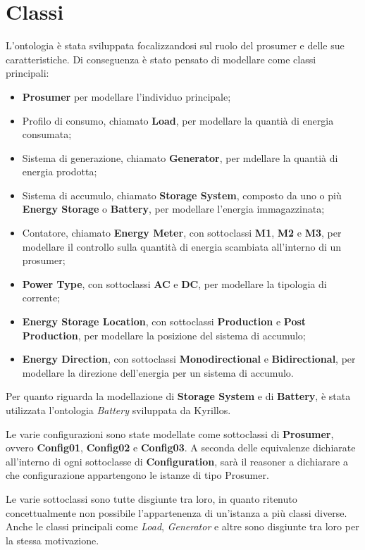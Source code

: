 \section{Classi}
L'ontologia è stata sviluppata focalizzandosi sul ruolo del prosumer e delle sue caratteristiche.
Di conseguenza è stato pensato di modellare come classi principali:
\begin{itemize}
    \item \textbf{Prosumer} per modellare l'individuo principale;
    \item Profilo di consumo, chiamato \textbf{Load}, per modellare la quantià di energia consumata;
    \item Sistema di generazione, chiamato \textbf{Generator}, per mdellare la quantià di energia prodotta;
    \item Sistema di accumulo, chiamato \textbf{Storage System}, composto da uno o più \textbf{Energy Storage} o \textbf{Battery}, per modellare l'energia immagazzinata;
    \item Contatore, chiamato \textbf{Energy Meter}, con sottoclassi \textbf{M1}, \textbf{M2} e \textbf{M3}, per modellare il controllo sulla quantità di energia scambiata all'interno di un prosumer;
    \item \textbf{Power Type}, con sottoclassi \textbf{AC} e \textbf{DC}, per modellare la tipologia di corrente;
    \item \textbf{Energy Storage Location}, con sottoclassi \textbf{Production} e \textbf{Post Production}, per modellare la posizione del sistema di accumulo;
    \item \textbf{Energy Direction}, con sottoclassi \textbf{Monodirectional} e \textbf{Bidirectional}, per modellare la direzione dell'energia per un sistema di accumulo.
\end{itemize}

Per quanto riguarda la modellazione di \textbf{Storage System} e di \textbf{Battery}, è stata utilizzata l'ontologia \textit{Battery} sviluppata da Kyrillos.

Le varie configurazioni sono state modellate come sottoclassi di \textbf{Prosumer}, ovvero \textbf{Config01}, \textbf{Config02} e \textbf{Config03}.
A seconda delle equivalenze dichiarate all'interno di ogni sottoclasse di \textbf{Configuration}, sarà il reasoner a dichiarare a che configurazione appartengono le istanze di tipo Prosumer.

Le varie sottoclassi sono tutte disgiunte tra loro, in quanto ritenuto concettualmente non possibile l'appartenenza di un'istanza a più classi diverse.
Anche le classi principali come \textit{Load}, \textit{Generator} e altre sono disgiunte tra loro per la stessa motivazione.


